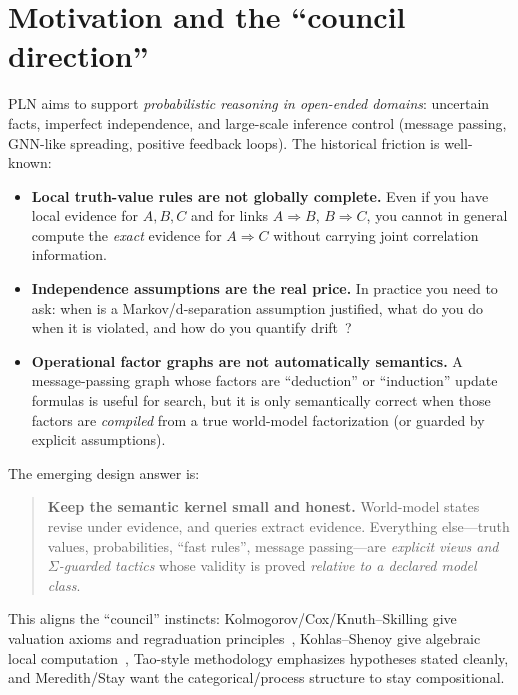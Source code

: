 \documentclass[11pt]{article}
\begin{document}
\tableofcontents

\section{Motivation and the ``council direction''}

PLN aims to support \emph{probabilistic reasoning in open-ended domains}: uncertain facts,
imperfect independence, and large-scale inference control (message passing, GNN-like spreading,
positive feedback loops). The historical friction is well-known:

\begin{itemize}[leftmargin=2em]
\item \textbf{Local truth-value rules are not globally complete.}
Even if you have local evidence for $A,B,C$ and for links $A\Rightarrow B$, $B\Rightarrow C$,
you cannot in general compute the \emph{exact} evidence for $A\Rightarrow C$
without carrying joint correlation information.
\item \textbf{Independence assumptions are the real price.}
In practice you need to ask: when is a Markov/d-separation assumption justified, what do you do
when it is violated, and how do you quantify drift~\cite{Pearl}?
\item \textbf{Operational factor graphs are not automatically semantics.}
A message-passing graph whose factors are ``deduction'' or ``induction'' update formulas is
useful for search, but it is only semantically correct when those factors are \emph{compiled}
from a true world-model factorization (or guarded by explicit assumptions).
\end{itemize}

The emerging design answer is:

\begin{quote}
\textbf{Keep the semantic kernel small and honest.}
World-model states revise under evidence, and queries extract evidence.
Everything else---truth values, probabilities, ``fast rules'', message passing---are
\emph{explicit views and $\Sigma$-guarded tactics} whose validity is proved
\emph{relative to a declared model class}.
\end{quote}

This aligns the ``council'' instincts: Kolmogorov/Cox/Knuth--Skilling give valuation axioms
and regraduation principles~\cite{KnuthSkilling},
Kohlas--Shenoy give algebraic local computation~\cite{KohlasShenoy},
Tao-style methodology emphasizes hypotheses stated cleanly,
and Meredith/Stay want the categorical/process structure to stay compositional.
\end{document}
